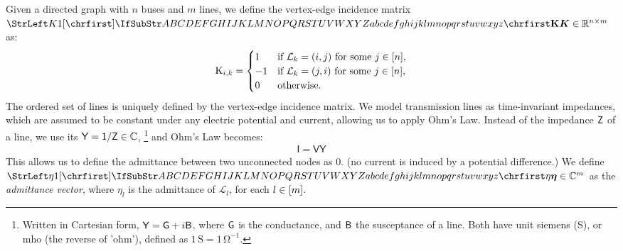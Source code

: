 \documentclass[main.tex]{subfiles}
\begin{document}
Given a directed graph with $n$ buses and $m$ lines, we define the vertex-edge incidence matrix $\mat{K} \in \mathbb{R}^{n \times m}$ as:
\begin{align*}
    {\mathrm{K}}_{i,k} =
    \begin{cases}
         1 & \text{if } \mathcal{L}_k=(i,j) \text{ for some } j \in [n], \\
        -1 & \text{if } \mathcal{L}_k=(j,i) \text{ for some } j \in [n], \\
         0 & \text{otherwise}.
    \end{cases}
\end{align*}
The ordered set of lines is uniquely defined by the vertex-edge incidence matrix.
We model transmission lines as time-invariant impedances, which are assumed to be constant under any electric potential and current, allowing us to apply Ohm's Law. Instead of the impedance $\mathsf{Z}$ of a line, we use its  $\mathsf{Y=1/Z} \in \mathbb{C}$,
\footnote{Written in Cartesian form, $\mathsf{Y=G}+i\mathsf{B}$, where $\mathsf{G}$ is the conductance, and $\mathsf{B}$ the susceptance of a line. Both have unit siemens (S), or mho (the reverse of 'ohm'), defined as $1 \,\si{\siemens}=1\,\si{\ohm}^{-1}$. }
 and Ohm's Law becomes:
\begin{align*}
    \mathsf{I=VY}
\end{align*}
This allows us to define the admittance between two unconnected nodes as $0$. (\ie no current is induced by a potential difference.) We define $\mat{\eta} \in \mathbb{C}^m$ as the \emph{admittance vector}, where $\eta_l$ is the admittance of $\mathcal{L}_l$, for each $l \in [m]$. 
\end{document}
